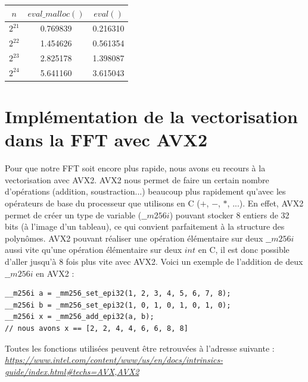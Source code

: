 \documentclass[12pt, a4paper]{article}
\begin{document}
\begin{center}
\begin{tabular}{||c c c||}
\hline
$n$ & $eval\_malloc()$ & $eval()$ \\
\hline\hline
$2^{21}$ & 0.769839 & 0.216310 \\
\hline
$2^{22}$ & 1.454626 & 0.561354 \\
\hline
$2^{23}$ & 2.825178 & 1.398087 \\
\hline
$2^{24}$ & 5.641160 & 3.615043 \\
\hline
\end{tabular}
\end{center}
{}

\newpage
\section{Implémentation de la vectorisation dans la FFT avec AVX2}

Pour que notre FFT soit encore plus rapide, nous avons eu recours à la vectorisation avec AVX2. AVX2 nous permet de faire un certain nombre d'opérations (addition, soustraction...) beaucoup plus rapidement qu'avec les opérateurs de base du processeur que utilisons \linebreak en C ($+$, $-$, $*$, ...). En effet, AVX2 permet de créer un type de variable ($\_\_m256i$) pouvant stocker 8 entiers de 32 bits (à l'image d'un tableau), ce qui convient parfaitement à la structure des polynômes. AVX2 pouvant réaliser une opération élémentaire sur deux $\_\_m256i$ aussi vite qu'une opération élémentaire sur deux $int$ en C, il est donc possible d'aller jusqu'à 8 fois plus vite avec AVX2. Voici un exemple de l'addition de deux $\_\_m256i$ en AVX2 : \\
{\begin{lstlisting}
__m256i a = _mm256_set_epi32(1, 2, 3, 4, 5, 6, 7, 8);
__m256i b = _mm256_set_epi32(1, 0, 1, 0, 1, 0, 1, 0);
__m256i x = _mm256_add_epi32(a, b);
// nous avons x == [2, 2, 4, 4, 6, 6, 8, 8]
\end{lstlisting}}
\noindent Toutes les fonctions utilisées peuvent être retrouvées à l'adresse suivante : \\ \href{https://www.intel.com/content/www/us/en/docs/intrinsics-guide/index.html\#techs=AVX,AVX2}{\textit{\color{blue}https://www.intel.com/content/www/us/en/docs/intrinsics-guide/index.html\#techs=AVX,AVX2}}
\end{document}
